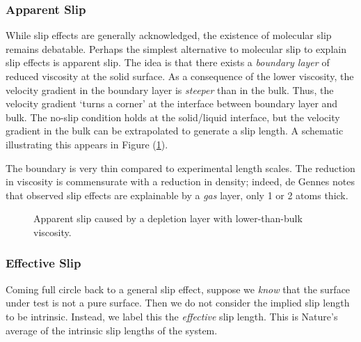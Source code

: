 \documentclass[12pt, a4paper, twoside, openright]{book}
\begin{document}
\subsubsection*{Apparent Slip}

While slip effects are generally acknowledged, the existence of molecular slip remains debatable. Perhaps the simplest alternative to molecular slip to explain slip effects is apparent slip. The idea is that there exists a \emph{boundary layer} of reduced viscosity at the solid surface. As a consequence of the lower viscosity, the velocity gradient in the boundary layer is \emph{steeper} than in the bulk. Thus, the velocity gradient `turns a corner' at the interface between boundary layer and bulk. The no-slip condition holds at the solid/liquid interface, but the velocity gradient in the bulk can be extrapolated to generate a slip length.  A schematic illustrating this appears in Figure (\ref{depletion}).

The boundary is very thin compared to experimental length scales. The reduction in viscosity is commensurate with a reduction in density; indeed, de Gennes notes that observed slip effects are explainable by a \emph{gas} layer, only 1 or 2 atoms thick. 

\begin{figure}[ht]
\centering
{}
\caption{Apparent slip caused by a depletion layer with lower-than-bulk viscosity.} \label{depletion}
\end{figure}

\subsubsection*{Effective Slip}

Coming full circle back to a general slip effect, suppose we \emph{know} that the surface under test is not a pure surface.  Then we do not consider the implied slip length to be intrinsic. Instead, we label this the \emph{effective} slip length. This is Nature's average of the intrinsic slip lengths of the system.
\end{document}
